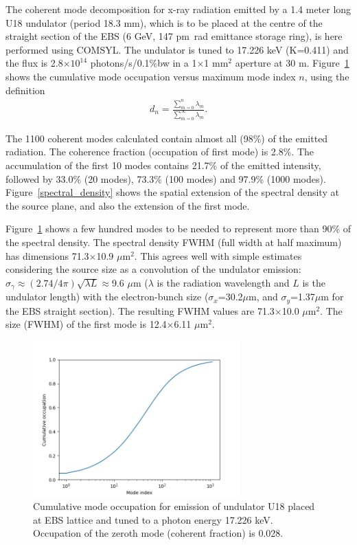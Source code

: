 \documentclass[%
 reprint,
 amsmath,amssymb,
 aps,
]{revtex4-1}
\begin{document}
The coherent mode decomposition for x-ray radiation emitted by a 1.4 meter long U18 undulator (period 18.3 mm), which is to be placed at the centre of the straight section of the EBS (6 GeV, 147 pm~rad emittance storage ring), is here performed using COMSYL. The undulator is tuned to 17.226 keV (K=0.411) and the flux is 2.8$\times 10^{14}$ photons/s/0.1\%bw in a 1$\times$1 mm$^2$ aperture at 30 m. Figure~\ref{cumulative_mode_occupation} shows the cumulative mode occupation versus maximum mode index $n$, using the definition
\begin{equation}
\begin{aligned}
\label{spectrum}
d_n=\frac{\sum_{m=0}^{n} \lambda_m}{\sum_{m=0}^{\infty} \lambda_m}.
\end{aligned}
\end{equation}

The 1100 coherent modes calculated contain almost all (98\%) of the emitted radiation. The coherence fraction (occupation of first mode) is 2.8\%. The accumulation of the first 10 modes contains 21.7\% of the emitted intensity, followed by 33.0\% (20 modes), 73.3\% (100 modes) and 97.9\% (1000 modes). 
Figure~\ref{spectral_density} shows the spatial extension of the spectral density at the source plane, and also the extension of the first mode.

Figure~\ref{cumulative_mode_occupation} shows a few hundred modes to be needed to represent more than 90\% of the spectral density. The spectral density FWHM (full width at half maximum) has dimensions 71.3$\times$10.9 $\mu$m$^2$. This agrees well with simple estimates considering the source size as a convolution of the undulator emission: $\sigma_\gamma\approx (2.74/4\pi) \sqrt{\lambda L}\approx$9.6 $\mu$m ($\lambda$ is the radiation wavelength and $L$ is the undulator length) with the electron-bunch size ($\sigma_x$=30.2$\mu$m, and $\sigma_y$=1.37$\mu$m for the EBS straight section). The resulting FWHM values are 71.3$\times$10.0 $\mu$m$^2$. The size (FWHM) of the first mode is 12.4$\times$6.11 $\mu$m$^2$.  

\begin{figure}
\includegraphics[width=8cm]{Figures/vx_cumulated.png}
\caption{Cumulative mode occupation for  emission of undulator U18 placed at EBS lattice and tuned to a photon energy 17.226 keV. Occupation of the zeroth mode (coherent fraction) is 0.028.}
\label{cumulative_mode_occupation}
\end{figure}
\end{document}
